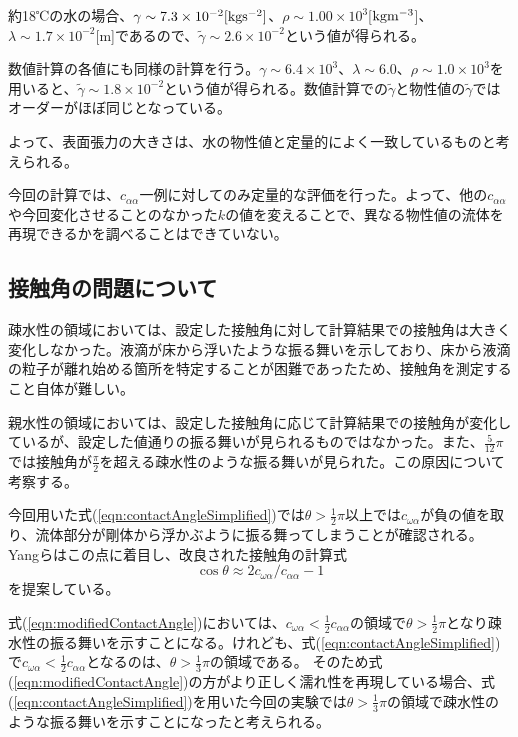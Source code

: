 \documentclass[]{jsarticle}
\begin{document}
約18℃の水の場合、$\gamma\sim 7.3\times 10^{-2}\rm{[kgs^{-2}]}$、$\rho\sim 1.00\times 10^3$[$\rm{kgm^{-3}}$]、$\lambda\sim 1.7\times10^{-2}$[m]であるので\cite{tatsumiKiso}、$\tilde{\gamma}\sim 2.6\times10^{-2}$という値が得られる。

数値計算の各値にも同様の計算を行う。$\gamma\sim6.4\times 10^3$、$\lambda\sim 6.0$、$\rho\sim1.0\times10^3$を用いると、$\tilde{\gamma}\sim1.8\times 10^{-2}$という値が得られる。数値計算での$\tilde{\gamma}$と物性値の$\tilde{\gamma}$ではオーダーがほぼ同じとなっている。

よって、表面張力の大きさは、水の物性値と定量的によく一致しているものと考えられる。

今回の計算では、$c_{\alpha\alpha}$一例に対してのみ定量的な評価を行った。よって、他の$c_{\alpha\alpha}$や今回変化させることのなかった$k$の値を変えることで、異なる物性値の流体を再現できるかを調べることはできていない。

\subsection{接触角の問題について}
\label{subsec:discContact}
疎水性の領域においては、設定した接触角に対して計算結果での接触角は大きく変化しなかった。液滴が床から浮いたような振る舞いを示しており、床から液滴の粒子が離れ始める箇所を特定することが困難であったため、接触角を測定すること自体が難しい。

親水性の領域においては、設定した接触角に応じて計算結果での接触角が変化しているが、設定した値通りの振る舞いが見られるものではなかった。また、$\frac{5}{12}\pi$では接触角が$\frac{\pi}{2}$を超える疎水性のような振る舞いが見られた。この原因について考察する。

今回用いた式(\ref{eqn:contactAngleSimplified})では$\theta>\frac{1}{2}\pi$以上では$c_{\omega\alpha}$が負の値を取り、流体部分が剛体から浮かぶように振る舞ってしまうことが確認される。Yang\cite{Yang2017}らはこの点に着目し、改良された接触角の計算式
\begin{equation}
  \label{eqn:modifiedContactAngle}
\cos \theta \approx 2c_{\omega\alpha}/c_{\alpha\alpha} -1
\end{equation}
を提案している。

式(\ref{eqn:modifiedContactAngle})においては、$c_{\omega\alpha}<\frac{1}{2}c_{\alpha\alpha}$の領域で$\theta>\frac{1}{2}\pi$となり疎水性の振る舞いを示すことになる。けれども、式(\ref{eqn:contactAngleSimplified})で$c_{\omega\alpha}<\frac{1}{2}c_{\alpha\alpha}$となるのは、$\theta>\frac{1}{3}\pi$の領域である。
そのため式(\ref{eqn:modifiedContactAngle})の方がより正しく濡れ性を再現している場合、式(\ref{eqn:contactAngleSimplified})を用いた今回の実験では$\theta>\frac{1}{3}\pi$の領域で疎水性のような振る舞いを示すことになったと考えられる。
\end{document}
